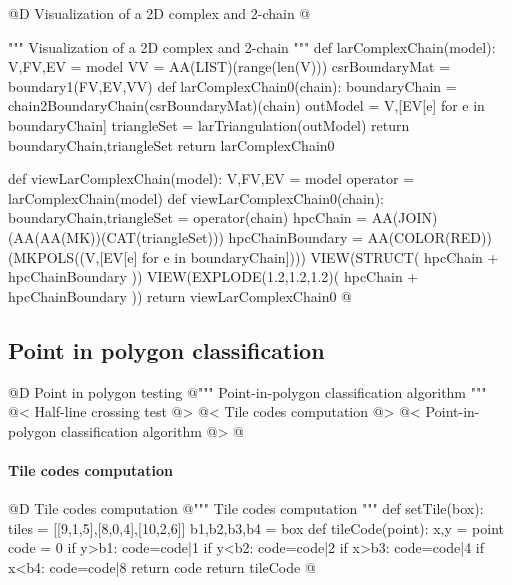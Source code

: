 \documentclass[11pt,oneside]{article}	%
\begin{document}
@D Visualization of a 2D complex and 2-chain
@{""" Visualization of a 2D complex and 2-chain """
def larComplexChain(model):
    V,FV,EV = model
    VV = AA(LIST)(range(len(V)))
    csrBoundaryMat = boundary1(FV,EV,VV)
    def larComplexChain0(chain):
        boundaryChain = chain2BoundaryChain(csrBoundaryMat)(chain)
        outModel = V,[EV[e] for e in boundaryChain]
        triangleSet = larTriangulation(outModel)
        return boundaryChain,triangleSet
    return larComplexChain0
    
def viewLarComplexChain(model):
    V,FV,EV = model
    operator = larComplexChain(model)
    def viewLarComplexChain0(chain):
        boundaryChain,triangleSet = operator(chain)
        hpcChain = AA(JOIN)(AA(AA(MK))(CAT(triangleSet)))
        hpcChainBoundary = AA(COLOR(RED))(MKPOLS((V,[EV[e] for e in boundaryChain])))
        VIEW(STRUCT( hpcChain + hpcChainBoundary ))
        VIEW(EXPLODE(1.2,1.2,1.2)( hpcChain + hpcChainBoundary ))
    return viewLarComplexChain0
@}




\subsection{Point in polygon classification}


@D Point in polygon testing
@{""" Point-in-polygon classification algorithm """
@< Half-line crossing test @>
@< Tile codes computation @>
@< Point-in-polygon classification algorithm @>
@}

\paragraph{Tile codes computation}
@D Tile codes computation
@{""" Tile codes computation """
def setTile(box):
    tiles = [[9,1,5],[8,0,4],[10,2,6]]
    b1,b2,b3,b4 = box
    def tileCode(point):
        x,y = point
        code = 0
        if y>b1: code=code|1
        if y<b2: code=code|2
        if x>b3: code=code|4
        if x<b4: code=code|8
        return code 
    return tileCode
@}
\end{document}
